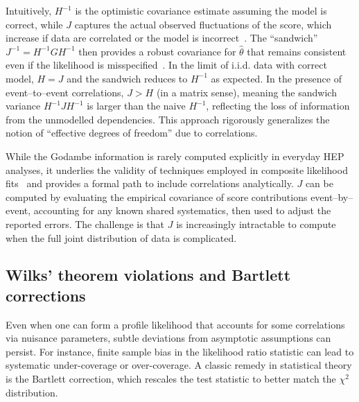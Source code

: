             Intuitively, $H^{-1}$ is the optimistic covariance estimate assuming the model is correct, while $J$ captures the actual observed fluctuations of the score, which increase if data are correlated or the model is incorrect~\cite{Geyer20135601Estimator, Geyer2020StatEquations}.
            The ``sandwich'' $ J^{-1} = H^{-1} G H^{-1}$ then provides a robust covariance for $\hat{\theta}$ that remains consistent even if the likelihood is misspecified~\cite{eicker_limit_1967, huber_behavior_1967, white_heteroskedasticity-consistent_1980}.
            In the limit of i.i.d. data with correct model, $H=J$ and the sandwich reduces to $H^{-1}$ as expected.
            In the presence of event--to--event correlations, $J > H$ (in a matrix sense), meaning the sandwich variance $H^{-1}JH^{-1}$ is larger than the naive $H^{-1}$, reflecting the loss of information from the unmodelled dependencies.
            This approach rigorously generalizes the notion of ``effective degrees of freedom'' due to correlations.
            
            While the Godambe information is rarely computed explicitly in everyday HEP analyses, it underlies the validity of techniques employed in composite likelihood fits~\cite{ZhouInformationSelection, Huang2022FastLikelihoods} and provides a formal path to include correlations analytically.
            $J$ can be computed by evaluating the empirical covariance of score contributions event--by--event, accounting for any known shared systematics, then used to adjust the reported errors.
            The challenge is that $J$ is increasingly intractable to compute when the full joint distribution of data is complicated.

        \subsection{Wilks’ theorem violations and Bartlett corrections}
            \label{subsec:bartlett-corrections}
            Even when one can form a profile likelihood that accounts for some correlations via nuisance parameters, subtle deviations from asymptotic assumptions can persist.
            For instance, finite sample bias in the likelihood ratio statistic can lead to systematic under-coverage or over-coverage.
            A classic remedy in statistical theory is the Bartlett correction, which rescales the test statistic to better match the $\chi^2$ distribution.
            
